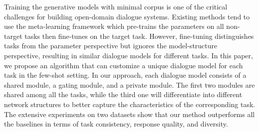 Training the generative models with minimal corpus is one of the critical challenges for building open-domain dialogue systems. Existing methods tend to use the meta-learning framework which pre-trains the parameters on all non-target tasks then fine-tunes on the target task. However, fine-tuning distinguishes tasks from the parameter perspective but ignores the model-structure perspective, resulting in similar dialogue models for different tasks. In this paper, we propose an algorithm that can customize a unique dialogue model for each task in the few-shot setting. In our approach, each dialogue model consists of a shared module, a gating module, and a private module. The first two modules are shared among all the tasks, while the third one will differentiate into different network structures to better capture the characteristics of the corresponding task. The extensive experiments on two datasets show that our method outperforms all the baselines in terms of task consistency, response quality, and diversity.
